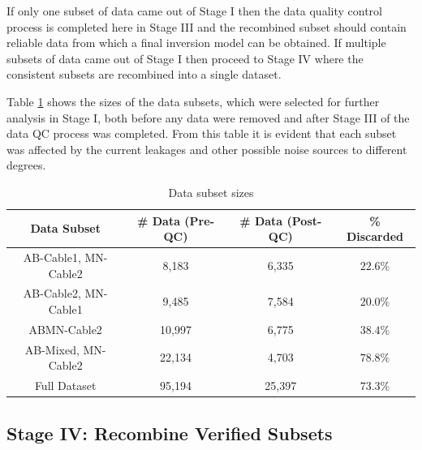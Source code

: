 \documentclass[final,authoryear,5p,times,twocolumn]{elsarticle}
\begin{document}
If only one subset of data came out of Stage I then the data quality control process is completed here in Stage III and the recombined subset should contain reliable data from which a final inversion model can be obtained. If multiple subsets of data came out of Stage I then proceed to Stage IV where the consistent subsets are recombined into a single dataset.

Table \ref{tab:DataSubsetSizes} shows the sizes of the data subsets, which were selected for further analysis in Stage I, both before any data were removed and after Stage III of the data QC process was completed. From this table it is evident that each subset was affected by the current leakages and other possible noise sources to different degrees.

\begin{table}[!ht]
\scriptsize
\begin{center}
  \begin{tabular}{| c | c | c | c |}
    \hline
    \bf{Data Subset} & \bf{\# Data (Pre-QC)} & \bf{\# Data (Post-QC)} & \bf{\% Discarded} \\
    \hline
    AB-Cable1, MN-Cable2 & 8,183 & 6,335 & $22.6 \%$ \\
    \hline
    AB-Cable2, MN-Cable1 & 9,485 & 7,584 & $20.0 \%$\\
    \hline
    ABMN-Cable2 & 10,997 & 6,775 & $38.4 \%$\\
    \hline
    AB-Mixed, MN-Cable2  & 22,134 & 4,703 & $78.8 \%$\\
    \hline
    Full Dataset  & 95,194 & 25,397 & $73.3 \%$\\
    \hline
  \end{tabular}
\caption{Data subset sizes}
\label{tab:DataSubsetSizes}
\end{center}
\end{table}

\subsection{Stage IV: Recombine Verified Subsets}
\label{Data_Quality_Control:StageIV_Recombine_Subsets}
\end{document}
